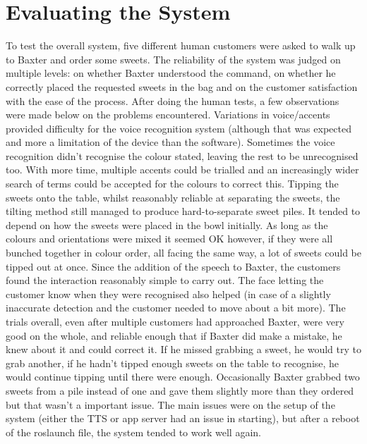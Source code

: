 \section{Evaluating the System}
To test the overall system, five different human customers were asked to walk up to Baxter and order some sweets. The reliability of the system was judged on multiple levels: on whether Baxter understood the command, on whether he correctly placed the requested sweets in the bag and on the customer satisfaction with the ease of the process. After doing the human tests, a few observations were made below on the problems encountered.
\newline\newline
Variations in voice/accents provided difficulty for the voice recognition system (although that was expected and more a limitation of the device than the software). Sometimes the voice recognition didn't recognise the colour stated, leaving the rest to be unrecognised too. With more time, multiple accents could be trialled and an increasingly wider search of terms could be accepted for the colours to correct this. Tipping the sweets onto the table, whilst reasonably reliable at separating the sweets, the tilting method still managed to produce hard-to-separate sweet piles. It tended to depend on how the sweets were placed in the bowl initially. As long as the colours and orientations were mixed it seemed OK however, if they were all bunched together in colour order, all facing the same way, a lot of sweets could be tipped out at once. Since the addition of the speech to Baxter, the customers found the interaction reasonably simple to carry out. The face letting the customer know when they were recognised also helped (in case of a slightly inaccurate detection and the customer needed to move about a bit more).
\newline\newline
The trials overall, even after multiple customers had approached Baxter, were very good on the whole, and reliable enough that if Baxter did make a mistake, he knew about it and could correct it. If he missed grabbing a sweet, he would try to grab another, if he hadn't tipped enough sweets on the table to recognise, he would continue tipping until there were enough. Occasionally Baxter grabbed two sweets from a pile instead of one and gave them slightly more than they ordered but that wasn't a important issue. The main issues were on the setup of the system (either the TTS or app server had an issue in starting), but after a reboot of the roslaunch file, the system tended to work well again. 
